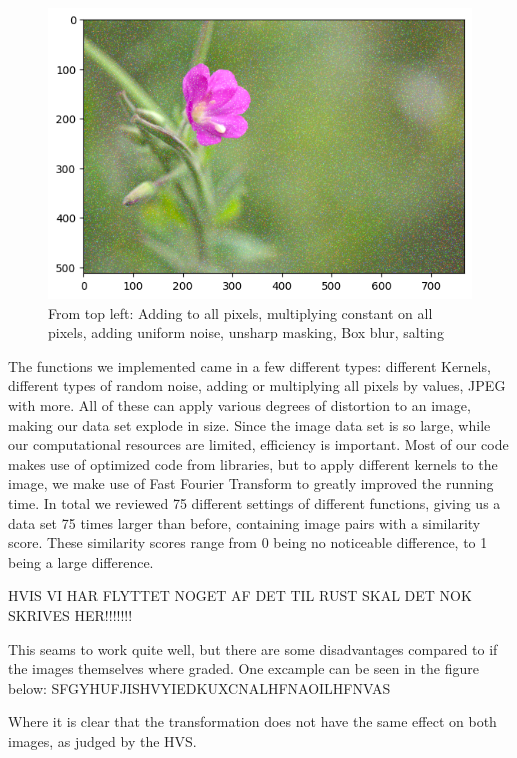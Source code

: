 \begin{figure}[H]
    \includegraphics[width=0.45\linewidth,origin=c]{Report/Pictures/LossFuntion/Salt.png}
    \caption{From top left: Adding to all pixels, multiplying constant on all pixels, adding uniform noise, unsharp masking, Box blur, salting}
    \label{distortions}
\end{figure}

The functions we implemented came in a few different types: different Kernels, different types of random noise, adding or multiplying all pixels by values, JPEG with more. All of these can apply various degrees of distortion to an image, making our data set explode in size. Since the image data set is so large, while our computational resources are limited, efficiency is important. Most of our code makes use of optimized code from libraries, but to apply different kernels to the image, we make use of Fast Fourier Transform to greatly improved the running time. In total we reviewed 75 different settings of different functions, giving us a data set 75 times larger than before, containing image pairs with a similarity score. These similarity scores range from 0 being no noticeable difference, to 1 being a large difference. 

HVIS VI HAR FLYTTET NOGET AF DET TIL RUST SKAL DET NOK SKRIVES HER!!!!!!!


This seams to work quite well, but there are some disadvantages compared to if the images themselves where graded. One excample can be seen in the figure below:
SFGYHUFJISHVYIEDKUXCNALHFNAOILHFNVAS

Where it is clear that the transformation does not have the same effect on both images, as judged by the HVS. 